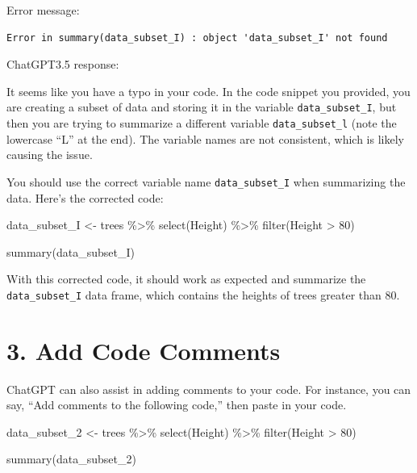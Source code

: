 \documentclass[
  letterpaper,
  DIV=11,
  numbers=noendperiod]{scrreprt}
\newenvironment{Shaded}{\begin{snugshade}}{\end{snugshade}}
\newcommand{\DecValTok}[1]{\textcolor[rgb]{0.68,0.00,0.00}{#1}}
\newcommand{\FunctionTok}[1]{\textcolor[rgb]{0.28,0.35,0.67}{#1}}
\newcommand{\NormalTok}[1]{\textcolor[rgb]{0.00,0.23,0.31}{#1}}
\newcommand{\OtherTok}[1]{\textcolor[rgb]{0.00,0.23,0.31}{#1}}
\newcommand{\SpecialCharTok}[1]{\textcolor[rgb]{0.37,0.37,0.37}{#1}}
\begin{document}
Error message:

\begin{verbatim}
Error in summary(data_subset_I) : object 'data_subset_I' not found
\end{verbatim}

ChatGPT3.5 response:

\label{chatgpt}
It seems like you have a typo in your code. In the code snippet you
provided, you are creating a subset of data and storing it in the
variable \texttt{data\_subset\_I}, but then you are trying to summarize
a different variable \texttt{data\_subset\_l} (note the lowercase ``L''
at the end). The variable names are not consistent, which is likely
causing the issue.

You should use the correct variable name \texttt{data\_subset\_I} when
summarizing the data. Here's the corrected code:

\begin{Shaded}
\begin{Highlighting}[]
\NormalTok{data\_subset\_I }\OtherTok{\textless{}{-}} 
\NormalTok{  trees }\SpecialCharTok{\%\textgreater{}\%}
  \FunctionTok{select}\NormalTok{(Height) }\SpecialCharTok{\%\textgreater{}\%} 
  \FunctionTok{filter}\NormalTok{(Height }\SpecialCharTok{\textgreater{}} \DecValTok{80}\NormalTok{)}

\FunctionTok{summary}\NormalTok{(data\_subset\_I)}
\end{Highlighting}
\end{Shaded}

With this corrected code, it should work as expected and summarize the
\texttt{data\_subset\_I} data frame, which contains the heights of trees
greater than 80.

\section{3. Add Code Comments}\label{add-code-comments}

ChatGPT can also assist in adding comments to your code. For instance,
you can say, ``Add comments to the following code,'' then paste in your
code.

\begin{Shaded}
\begin{Highlighting}[]
\NormalTok{data\_subset\_2 }\OtherTok{\textless{}{-}} 
\NormalTok{  trees }\SpecialCharTok{\%\textgreater{}\%}
  \FunctionTok{select}\NormalTok{(Height) }\SpecialCharTok{\%\textgreater{}\%} 
  \FunctionTok{filter}\NormalTok{(Height }\SpecialCharTok{\textgreater{}} \DecValTok{80}\NormalTok{)}

\FunctionTok{summary}\NormalTok{(data\_subset\_2)}
\end{Highlighting}
\end{Shaded}
\end{document}
